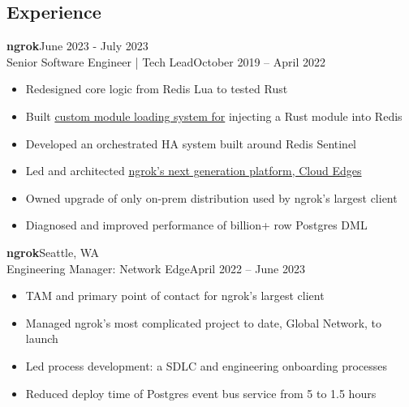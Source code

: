 \documentclass[margin]{res}
\begin{document}
  \begin{resume}
    \section{Experience}
       \textbf{ngrok}\hfill June 2023 - July 2023\\
         Senior Software Engineer | Tech Lead\hfill October 2019 -- April 2022\\
         \begin{itemize} \itemsep -1pt  %
            \item Redesigned core logic from Redis Lua to tested Rust
            \item Built \href{https://github.com/brhoades/redis-loadmodbytes}{custom module loading system for} injecting a Rust module into Redis
            \item Developed an orchestrated HA system built around Redis Sentinel
            \item Led and architected \href{https://ngrok.com/next-generation}{ngrok's next generation platform, Cloud Edges}
            \item Owned upgrade of only on-prem distribution used by ngrok's largest client
            \item Diagnosed and improved performance of billion+ row Postgres DML
         \end{itemize}

       \textbf{ngrok}\hfill Seattle, WA\\
         Engineering Manager: Network Edge\hfill April 2022 -- June 2023\\
         \begin{itemize} \itemsep -1pt  %
            \item TAM and primary point of contact for ngrok's largest client
            \item Managed ngrok's most complicated project to date, Global Network, to launch
            \item Led process development: a SDLC and engineering onboarding processes
            \item Reduced deploy time of Postgres event bus service from 5 to 1.5 hours
         \end{itemize}



\end{resume}
\end{document}

